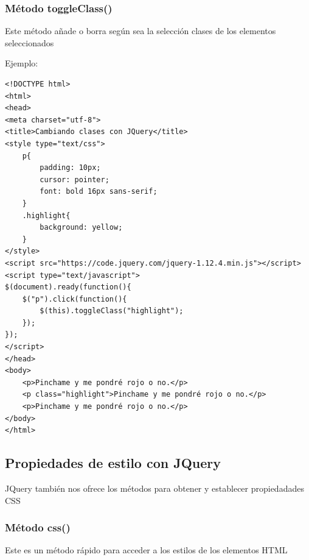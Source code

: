 \documentclass[11pt]{article}
\begin{document}
\subsubsection*{Método toggleClass()}
\label{sec:org73b3e69}

Este método añade o borra según sea la selección clases de los elementos seleccionados

Ejemplo:

\begin{verbatim}
<!DOCTYPE html>
<html>
<head>
<meta charset="utf-8">
<title>Cambiando clases con JQuery</title>
<style type="text/css">
    p{
        padding: 10px;
        cursor: pointer;        
        font: bold 16px sans-serif;
    }
    .highlight{
        background: yellow;
    }         
</style>
<script src="https://code.jquery.com/jquery-1.12.4.min.js"></script>
<script type="text/javascript">
$(document).ready(function(){
    $("p").click(function(){
        $(this).toggleClass("highlight");
    });
});
</script>
</head>
<body>
    <p>Pinchame y me pondré rojo o no.</p>
    <p class="highlight">Pinchame y me pondré rojo o no.</p>
    <p>Pinchame y me pondré rojo o no.</p>
</body>
</html>                                		
\end{verbatim}

\subsection*{Propiedades de estilo con JQuery}
\label{sec:org3b178a9}

JQuery también nos ofrece los métodos para obtener y establecer propiedadades CSS 

\subsubsection*{Método css()}
\label{sec:orgd0604af}

Este es un método rápido para acceder a los estilos de los elementos HTML
\end{document}
